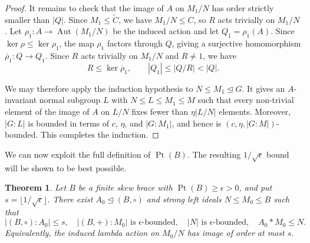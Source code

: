 \documentclass[11pt, oneside]{amsart}
\numberwithin{equation}{section}
\theoremstyle{plain}
\newtheorem{thm}[equation]{Theorem}
\theoremstyle{definition}
\newcommand{\Pt}{\operatorname{Pt} }
\newcommand{\Aut}{\operatorname{Aut} }
\begin{document}
\begin{proof}
It remains to check that the image of $A$ on $M_1/N$ has order strictly smaller than $|Q|$. Since $M_1\leqslant\widetilde C$, we have $M_1/N\leqslant C$, so $R$ acts trivially on $M_1/N$. Let $\rho_1:A\to\Aut(M_1/N)$ be the induced action and let $Q_1=\rho_1(A)$. Since $\ker\rho\leqslant\ker\rho_1$, the map $\rho_1$ factors through $Q$, giving a surjective homomorphism $\overline\rho_1:Q\to Q_1$. Since $R$ acts trivially on $M_1/N$ and $R\neq 1$, we have
$$
R\leqslant\ker\overline\rho_1,
\qquad
|Q_1|\leqslant |Q/R|<|Q|.
$$

We may therefore apply the induction hypothesis to $N\leqslant M_1\unlhd G$. It gives an $A$-invariant normal subgroup $L$ with $N\leqslant L\leqslant M_1\leqslant M$ such that every non-trivial element of the image of $A$ on $L/N$ fixes fewer than $\eta|L/N|$ elements. Moreover, $|G:L|$ is bounded in terms of $c$, $\eta$, and $|G:M_1|$, and hence is $(c,\eta,|G:M|)$-bounded. This completes the induction.
\end{proof}




We can now exploit the full definition of $\Pt(B)$. The resulting
$1/\sqrt{\epsilon}$ bound will be shown to be best possible.

\begin{thm}\label{thm:Pt-optimal}
Let $B$ be a finite skew brace with $\Pt(B)\geqslant\epsilon>0$, and put
$s=\lfloor1/\sqrt{\epsilon}\rfloor$. There exist
$A_0\unlhd(B,\circ)$ and strong left ideals $N\leqslant M_0\leqslant B$
such that
$$
|(B,\circ):A_0|\leqslant s,\quad
|(B,+):M_0|\text{ is $\epsilon$-bounded},\quad
|N|\text{ is $\epsilon$-bounded},\quad
A_0*M_0\leqslant N.
$$
Equivalently, the induced lambda action on $M_0/N$ has image of order
at most $s$.
\end{thm}
\end{document}
